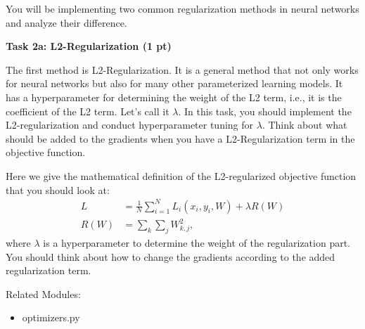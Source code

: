 \noindent You will be implementing two common regularization methods in neural networks and analyze their difference.


\hfill

\noindent \textbf{Task 2a: L2-Regularization {\bf (1 pt)} }

\hfill 

\noindent The first method is L2-Regularization. It is a general method that not only works for neural networks but also for many other parameterized learning models. It has a hyperparameter for determining the weight of the L2 term, i.e., it is the coefficient of the L2 term. Let's call it $\lambda$. In this task, you should implement the L2-regularization and conduct hyperparameter tuning for $\lambda$. Think about what should be added to the gradients when you have a L2-Regularization term in the objective function. 

\hfill

\noindent Here we give the mathematical definition of the L2-regularized objective function that you should look at:
\begin{align}
L &= \frac{1}{N} \sum_{i=1}^N L_i(x_i, y_i, W) + \lambda R(W) \label{eq:l2}\\
R(W) &= \sum_k \sum_j W_{k, j}^2,
\end{align}
where $\lambda$ is a hyperparameter to determine the weight of the regularization part. You should think about how to change the gradients according to the added regularization term.

\hfill

\noindent Related Modules: 
\begin{itemize}
\item optimizers.py
\end{itemize}

